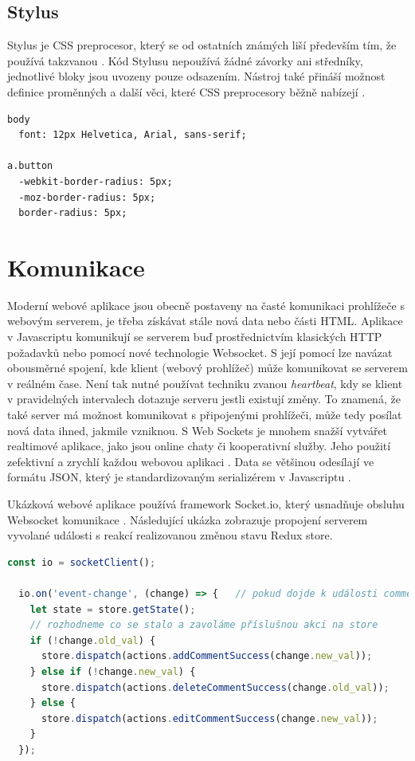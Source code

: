 \subsection{Stylus}
Stylus je CSS preprocesor, který se od ostatních známých liší především tím, že používá takzvanou . Kód Stylusu nepoužívá žádné závorky ani středníky, jednotlivé bloky jsou uvozeny pouze odsazením. Nástroj také přináší možnost definice proměnných a další věci, které CSS preprocesory běžně nabízejí \cite{stylus}.

\begin{lstlisting}[caption={Ukázka stylování v jazyce Stylus}]
body
  font: 12px Helvetica, Arial, sans-serif;

a.button
  -webkit-border-radius: 5px;
  -moz-border-radius: 5px;
  border-radius: 5px;
\end{lstlisting}

\section{Komunikace}
Moderní webové aplikace jsou obecně postaveny na časté komunikaci prohlížeče s webovým serverem, je třeba získávat stále nová data nebo části HTML. Aplikace v Javascriptu komunikují se serverem buď prostřednictvím klasických HTTP požadavků nebo pomocí nové technologie Websocket. S její pomocí lze navázat obousměrné spojení, kde klient (webový prohlížeč) může komunikovat se serverem v reálném čase. Není tak nutné používat techniku zvanou \textit{heartbeat}, kdy se klient v pravidelných intervalech dotazuje serveru jestli existují změny. To znamená, že také server má možnost komunikovat s připojenými prohlížeči, může tedy posílat nová data ihned, jakmile vzniknou. S Web Sockets je mnohem snažší vytvářet realtimové aplikace, jako jsou online chaty či kooperativní služby. Jeho použití zefektivní a zrychlí každou webovou aplikaci \cite{websocket}. Data se většinou odesílají ve formátu JSON, který je standardizovaným serializérem v Javascriptu \cite{json}.

Ukázková webové aplikace používá framework Socket.io, který usnadňuje obsluhu Websocket komunikace \cite{socketio}. Následující ukázka zobrazuje propojení serverem vyvolané události s reakcí realizovanou změnou stavu Redux store.
\begin{lstlisting}[language=Javascript,caption={Ukázka propojení Websocketu s Redux store}]
  const io = socketClient();

  io.on('event-change', (change) => {   // pokud dojde k události comment-change
    let state = store.getState();
    // rozhodneme co se stalo a zavoláme příslušnou akci na store
    if (!change.old_val) {
      store.dispatch(actions.addCommentSuccess(change.new_val));
    } else if (!change.new_val) {
      store.dispatch(actions.deleteCommentSuccess(change.old_val));
    } else {
      store.dispatch(actions.editCommentSuccess(change.new_val));
    }
  });
\end{lstlisting}

